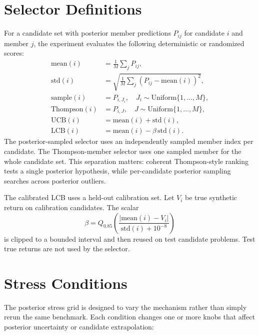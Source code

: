 \documentclass{article}
\begin{document}
\section{Selector Definitions}

For a candidate set with posterior member predictions
$P_{ij}$ for candidate $i$ and member $j$, the experiment evaluates the
following deterministic or randomized scores:
\begin{align}
    \text{mean}(i) &= \frac{1}{M}\sum_j P_{ij},\\
    \text{std}(i) &= \sqrt{\frac{1}{M}\sum_j (P_{ij}-\text{mean}(i))^2},\\
    \text{sample}(i) &= P_{i,J_i},\quad J_i\sim \text{Uniform}\{1,\ldots,M\},\\
    \text{Thompson}(i) &= P_{i,J},\quad J\sim \text{Uniform}\{1,\ldots,M\},\\
    \text{UCB}(i) &= \text{mean}(i)+\text{std}(i),\\
    \text{LCB}(i) &= \text{mean}(i)-\beta\,\text{std}(i).
\end{align}
The posterior-sampled selector uses an independently sampled member index per
candidate. The Thompson-member selector uses one sampled member for the whole
candidate set. This separation matters: coherent Thompson-style ranking tests a
single posterior hypothesis, while per-candidate posterior sampling searches
across posterior outliers.

The calibrated LCB uses a held-out calibration set. Let $V_i$ be true synthetic
return on calibration candidates. The scalar
\begin{equation}
    \beta = Q_{0.85}\left(\frac{|\text{mean}(i)-V_i|}{\text{std}(i)+10^{-8}}\right)
\end{equation}
is clipped to a bounded interval and then reused on test candidate problems.
Test true returns are not used by the selector.

\section{Stress Conditions}

The posterior stress grid is designed to vary the mechanism rather than simply
rerun the same benchmark. Each condition changes one or more knobs that affect
posterior uncertainty or candidate extrapolation:
\end{document}
